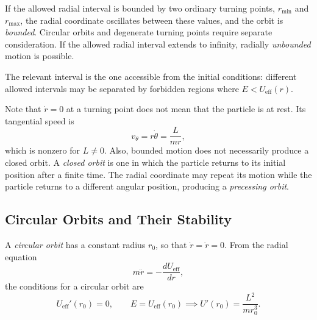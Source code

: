 \documentclass[12pt]{article}
\begin{document}
If the allowed radial interval is bounded by two ordinary
turning points, $r_{\min}$ and $r_{\max}$, the radial coordinate oscillates between these values, and the orbit is \emph{bounded}. Circular orbits and degenerate turning points require separate consideration. If the allowed radial interval extends to infinity, radially \emph{unbounded} motion is possible.

The relevant interval is the one accessible from the initial conditions: different allowed intervals may be separated by forbidden regions where $E<U_{\mathrm{eff}}(r)$.

Note that $\dot r=0$ at a turning point does not mean that the particle is at rest. Its tangential speed is
\[
    v_\theta=r\dot\theta=\frac{L}{mr},
\]
which is nonzero for $L\neq0$. Also, bounded motion does not necessarily produce a closed orbit. A \emph{closed orbit} is one in which the particle returns to its initial position after a finite time. The radial coordinate may repeat its motion while the particle returns to a different angular position, producing a \emph{precessing orbit}.

\subsection{Circular Orbits and Their Stability}

A \emph{circular orbit} has a constant radius $r_0$, so that
$\dot r=\ddot r=0$. From the radial equation
\[
    m\ddot r=-\frac{dU_{\mathrm{eff}}}{dr},
\]
the conditions for a circular orbit are
\[
    U_{\mathrm{eff}}'(r_0)=0,
    \qquad
    E=U_{\mathrm{eff}}(r_0) \implies U'(r_0)=\frac{L^2}{mr_0^3}.
\]
\end{document}
